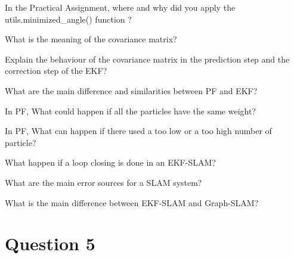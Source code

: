\documentclass[parcial]{lcc}
\begin{document}
\maketitle




\ejercicio In the Practical Assignment, where and why did you apply the utils.minimized\_angle() function ?

\ejercicio What is the meaning of the covariance matrix?

\ejercicio Explain the behaviour of the covariance matrix in the prediction step and the correction step of the EKF?

\ejercicio What are the main difference and similarities between PF and EKF?

\ejercicio In PF, What could happen if all the particles have the same weight?

\ejercicio In PF, What can happen if there used a too low or a too high number of particle?

\ejercicio What happen if a loop closing is done in an EKF-SLAM?


\ejercicio What are the main error sources for a SLAM system?

\ejercicio What is the main difference between EKF-SLAM and Graph-SLAM?


\section*{Question 5}
\end{document}
